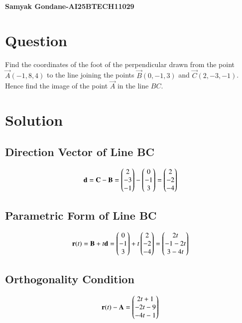 \documentclass{article}
\begin{document}
\begin{center}
\large
    \textbf{Samyak Gondane-AI25BTECH11029}
\end{center}
\date{}

\section*{Question}
Find the coordinates of the foot of the perpendicular drawn from the point $\vec{A}(-1, 8, 4)$ to the line joining the points $\vec{B}(0, -1, 3)$ and $\vec{C}(2, -3, -1)$. Hence find the image of the point $\vec{A}$ in the line $BC$.

\section*{Solution}

\subsection*{Direction Vector of Line BC}
\begin{align}
\mathbf{d} = \mathbf{C} - \mathbf{B} = 
\begin{pmatrix}2 \\ -3 \\ -1\end{pmatrix} - \begin{pmatrix}0 \\ -1 \\ 3\end{pmatrix} = \begin{pmatrix}2 \\ -2 \\ -4\end{pmatrix}
\end{align}

\subsection*{Parametric Form of Line BC}
\begin{align}
\mathbf{r}(t) = \mathbf{B} + t\mathbf{d} = 
\begin{pmatrix}
0 \\ -1 \\ 3
\end{pmatrix}
+ t
\begin{pmatrix}
2 \\ -2 \\ -4
\end{pmatrix}
=
\begin{pmatrix}
2t \\ -1 - 2t \\ 3 - 4t
\end{pmatrix}
\end{align}

\subsection*{Orthogonality Condition}
\begin{align}
\mathbf{r}(t) - \mathbf{A} =
\begin{pmatrix}2t + 1 \\ -2t - 9 \\ -4t - 1\end{pmatrix}
\end{align}
\end{document}
